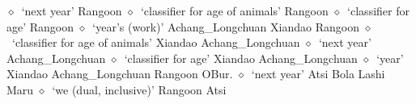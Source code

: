          $\diamond$~`next year'
         Rangoon 
\hspace{1ex}
         $\diamond$~`classifier for age of animals'
         Rangoon 
\hspace{1ex}
         $\diamond$~`classifier for age'
         Rangoon 
\hspace{1ex}
         $\diamond$~`year's (work)'
         Achang\_Longchuan 
\hspace{1ex}
         Xiandao 
\hspace{1ex}
         Rangoon 
\hspace{1ex}
         $\diamond$~`classifier for age of animals'
         Xiandao 
\hspace{1ex}
         Achang\_Longchuan 
\hspace{1ex}
         $\diamond$~`next year'
         Achang\_Longchuan 
\hspace{1ex}
         $\diamond$~`classifier for age'
         Xiandao 
\hspace{1ex}
         Achang\_Longchuan 
\hspace{1ex}
         $\diamond$~`year'
         Xiandao 
\hspace{1ex}
         Achang\_Longchuan 
\hspace{1ex}
         Rangoon 
\hspace{1ex}
         OBur. 
\hspace{1ex}
         $\diamond$~`next year'
         Atsi 
\hspace{1ex}
         Bola 
\hspace{1ex}
         Lashi 
\hspace{1ex}
         Maru 
\hspace{1ex}
         $\diamond$~`we (dual, inclusive)'
         Rangoon 
\hspace{1ex}
         Atsi 
\hspace{1ex}
